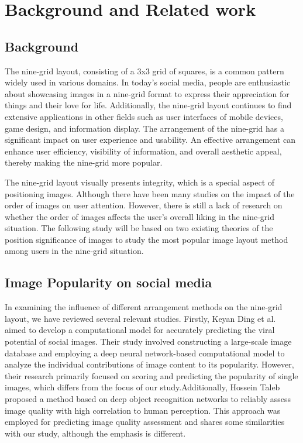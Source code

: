 \section{Background and Related work}
\subsection{Background}

The nine-grid layout, consisting of a 3x3 grid of squares, is a common pattern widely used in various domains. In today's social media, people are enthusiastic about showcasing images in a nine-grid format to express their appreciation for things and their love for life. Additionally, the nine-grid layout continues to find extensive applications in other fields such as user interfaces of mobile devices, game design, and information display. The arrangement of the nine-grid has a significant impact on user experience and usability. An effective arrangement can enhance user efficiency, visibility of information, and overall aesthetic appeal, thereby making the nine-grid more popular. 

The nine-grid layout visually presents integrity, which is a special aspect of positioning images. Although there have been many studies on the impact of the order of images on user attention. However, there is still a lack of research on whether the order of images affects the user's overall liking in the nine-grid situation. The following study will be based on two existing theories of the position significance of images to study the most popular image layout method among users in the nine-grid situation.

\subsection{Image Popularity on social media}

In examining the influence of different arrangement methods on the nine-grid layout, we have reviewed several relevant studies. Firstly, Keyan Ding et al\cite{ding2019intrinsic}. aimed to develop a computational model for accurately predicting the viral potential of social images. Their study involved constructing a large-scale image database and employing a deep neural network-based computational model to analyze the individual contributions of image content to its popularity. However, their research primarily focused on scoring and predicting the popularity of single images, which differs from the focus of our study.Additionally, Hossein Taleb\cite{talebi2018nima} proposed a method based on deep object recognition networks to reliably assess image quality with high correlation to human perception. This approach was employed for predicting image quality assessment and shares some similarities with our study, although the emphasis is different.

